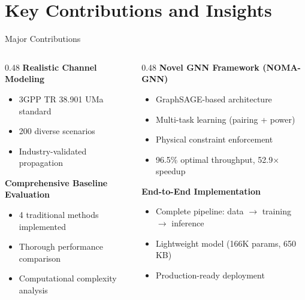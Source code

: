 \documentclass[aspectratio=169]{beamer}
\begin{document}
\section{Key Contributions and Insights}

\begin{frame}{Major Contributions}
\begin{columns}
        \begin{column}{0.48\textwidth}
            \textbf{Realistic Channel Modeling}
            \begin{itemize}
                \item 3GPP TR 38.901 UMa standard
                \item 200 diverse scenarios
                \item Industry-validated propagation
            \end{itemize}

            \vspace{0.4cm}

            \textbf{Comprehensive Baseline Evaluation}
            \begin{itemize}
                \item 4 traditional methods implemented
                \item Thorough performance comparison
                \item Computational complexity analysis
            \end{itemize}
        \end{column}

        \begin{column}{0.48\textwidth}
            \textbf{Novel GNN Framework (NOMA-GNN)}
            \begin{itemize}
                \item GraphSAGE-based architecture
                \item Multi-task learning (pairing + power)
                \item Physical constraint enforcement
                \item 96.5\% optimal throughput, 52.9× speedup
            \end{itemize}

            \vspace{0.4cm}

            \textbf{End-to-End Implementation}
            \begin{itemize}
                \item Complete pipeline: data $\to$ training $\to$ inference
                \item Lightweight model (166K params, 650 KB)
                \item Production-ready deployment
            \end{itemize}
        \end{column}
    \end{columns}
\end{frame}
\end{document}
